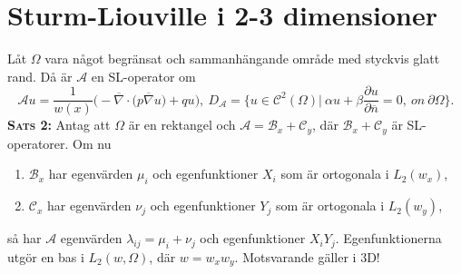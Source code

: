 \documentclass{article}
\begin{document}
\section{Sturm-Liouville i 2-3 dimensioner}
Låt $\Omega$ vara något begränsat och sammanhängande område med styckvis glatt rand. Då är $\mathcal{A}$ en SL-operator om 
$$
\mathcal{A}u=\frac{1}{w(x)}\Big(-\overline{\nabla}\cdot\big(p\overline{\nabla} u\big)+qu\Big), \ D_{\mathcal{A}}=\{u\in\mathcal{C}^2(\Omega)| \ \alpha u + \beta \frac{\partial u}{\partial \overline{n}}=0, \ on \ \partial\Omega\}. 
$$
\textbf{\textsc{Sats 2:}} Antag att $\Omega$ är en rektangel och $\mathcal{A}=\mathcal{B}_x+\mathcal{C}_y$, där $\mathcal{B}_x+\mathcal{C}_y$ är SL-operatorer. Om nu 
\begin{enumerate}[label=(\roman*)]
\item $\mathcal{B}_x$ har egenvärden $\mu_i$ och egenfunktioner $X_i$ som är ortogonala i $L_2(w_x)$,\\
\item $\mathcal{C}_x$ har egenvärden $\nu_j$ och egenfunktioner $Y_j$ som är ortogonala i $L_2(w_y)$,
\end{enumerate}
så har $\mathcal{A}$ egenvärden $\lambda_{ij}=\mu_i+\nu_j$ och egenfunktioner $X_iY_j$. Egenfunktionerna utgör en bas i $L_2(w,\Omega)$, där $w=w_xw_y$. Motsvarande gäller i 3D!
\end{document}
